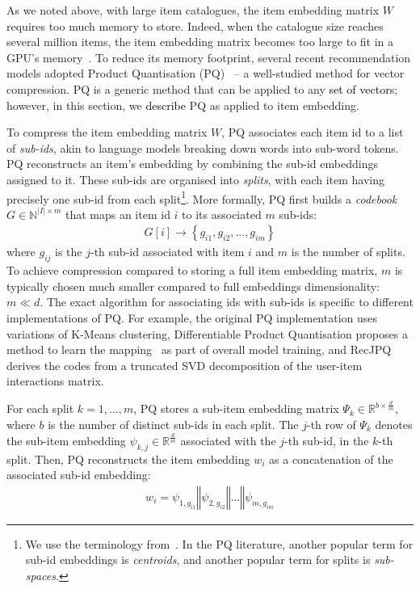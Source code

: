 \documentclass[sigconf,natbib=true, review=true]{acmart} %
\newcommand{\pageenlarge}[1]{\marginnote{}\enlargethispage{#1\baselineskip}}
\newcommand{\nt}[1]{\textcolor{black}{#1}}
\begin{document}
As we noted above, with large item catalogues, the item embedding matrix $W$ requires too much memory to store. Indeed, when the catalogue size reaches several million items, the item embedding matrix becomes too large to fit in a GPU's memory~\cite{petrovRecJPQTrainingLargeCatalogue2024}. To reduce its memory footprint, several recent recommendation models adopted Product Quantisation (PQ)~\cite{jegouProductQuantizationNearest2011} -- a well-studied method for vector compression. PQ is a generic method that can be applied to any \nt{set of vectors}; however, in this section, we \nt{describe} PQ as applied to item embedding. 

 To compress the item embedding matrix $W$, PQ associates each item id to a list of {\em sub-ids}, akin to language models breaking down words into sub-word tokens. PQ reconstructs an item's embedding by combining the sub-id embeddings assigned to it. These sub-ids are organised into {\em splits}, with each item having precisely one sub-id from each split\footnote{We use the terminology from~\cite{petrovRecJPQTrainingLargeCatalogue2024}. In the PQ literature, another popular term for sub-id embeddings is \emph{centroids}, and another popular term for splits is \emph{sub-spaces}.}. More formally, PQ first builds a \emph{codebook} $G\in\mathbb{N}^{|I|\times m}$ that maps an item id $i$ to its associated $m$ sub-ids:
\begin{align}
    G[i] \rightarrow \left\{g_{i1}, g_{i2}, ..., g_{im}\right\} \label{eq:sub_ids_map}
\end{align}
where $g_{ij}$ is the $j$-th sub-id associated with item $i$ and $m$ is the number of splits. To achieve compression compared to storing a full item embedding matrix, $m$ is typically chosen much smaller compared to full embeddings dimensionality: $m \ll d$.
The exact algorithm for associating ids with sub-ids is specific to different implementations of PQ. For example, the original PQ implementation uses variations of K-Means clustering, Differentiable Product Quantisation proposes a method to learn the mapping~\cite{chenDifferentiableProductQuantization2020} as part of overall model training, and RecJPQ~\cite{petrovRecJPQTrainingLargeCatalogue2024} derives the codes from a truncated SVD decomposition of the user-item interactions matrix. 


For each split $k=1,\ldots,m$, PQ stores a sub-item embedding matrix $\Psi_k \in \mathbb{R}^{b\times\frac{d}{m}}$, where $b$ is the number of distinct sub-ids in each split. The $j$-th row of $\Psi_k$ denotes the sub-item embedding $\psi_{k,j} \in \mathbb{R}^{\frac{d}{m}}$ associated with the $j$-th sub-id, in the $k$-th split.
Then, PQ reconstructs the item embedding $w_i$ as a concatenation of the associated sub-id embedding: 
\begin{align}
    w_i =  \psi_{1,g_{i1}} \mathbin\Vert \psi_{2,g_{i2}}  \mathbin\Vert ... \mathbin\Vert  \psi_{m,g_{im}} \label{eq:pq:item_embedding}
\end{align}
\end{document}
